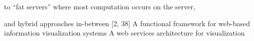 \documentclass{article}
\begin{document}
 
to “fat servers” where most computation occurs on the server,

 and hybrid approaches in-between [2, 38]
A functional framework for web-based information visualization systems
A web services architecture for visualization






\end{document}
